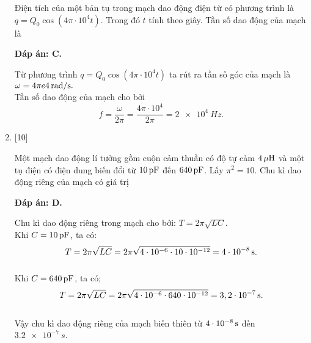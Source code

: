 \begin{enumerate}[label=\bfseries Câu \arabic*:]
	\cauhoi
	{Điện tích của một bản tụ trong mạch dao động điện từ có phương trình là $q = Q_0 \cos \left( 4\pi \cdot 10^{4}t \right)$. Trong đó $t$ tính theo giây. Tần số dao động của mạch là
	}
	
	\loigiai
	{		\textbf{Đáp án: C.}
	
		Từ phương trình $q = Q_0 \cos \left( 4\pi \cdot 10^{4}t \right)$ ta rút ra tần số góc của mạch là $\omega = \xsi{4 \pi e4}{rad/s}.$ \\
		Tần số dao động của mạch cho bởi
		$$f = \dfrac{\omega}{2\pi} = \dfrac{4\pi \cdot 10^{4}}{2\pi} = \SI{2 e4}{Hz}.$$
		
	}

	\item {} [10] %
	
	\cauhoi
	{Một mạch dao động lí tưởng gồm cuộn cảm thuần có độ tự cảm $\xsi{4}{\mu H}$ và một tụ điện có điện dung biến đổi từ $\xsi{10}{pF}$ đến $\xsi{640}{pF}$. Lấy $\pi^2 = 10$. Chu kì dao động riêng của mạch có giá trị
	}
	
	\loigiai
	{		\textbf{Đáp án: D.}
		
		Chu kì dao động riêng trong mạch cho bởi: $T = 2\pi \sqrt{LC}$. \\
		Khi $C = \xsi{10}{pF}$, ta có:
		$$
			T = 2\pi \sqrt{LC} = 2\pi \sqrt{4\cdot10^{-6} \cdot 10\cdot10^{-12}} = \xsi{4\cdot10^{-8}}{s}.
		$$ \\
		Khi $C = \xsi{640}{pF}$, ta có;
		$$
			T = 2\pi \sqrt{LC} = 2\pi \sqrt{4\cdot10^{-6} \cdot 640\cdot10^{-12}} = \xsi{3,2\cdot10^{-7}}{s}.
		$$ \\
		Vậy chu kì dao động riêng của mạch biến thiên từ $\xsi{4\cdot10^{-8}}{s}$ đến $\SI{3,2 e-7}{s}$.
	}
	

\end{enumerate}
